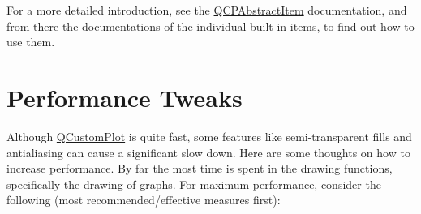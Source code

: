 For a more detailed introduction, see the \hyperlink{a00022}{Q\+C\+P\+Abstract\+Item} documentation, and from there the documentations of the individual built-\/in items, to find out how to use them.\hypertarget{index_performancetweaks}{}\section{Performance Tweaks}\label{index_performancetweaks}
Although \hyperlink{a00030_d8/d00/a00186}{Q\+Custom\+Plot} is quite fast, some features like semi-\/transparent fills and antialiasing can cause a significant slow down. Here are some thoughts on how to increase performance. By far the most time is spent in the drawing functions, specifically the drawing of graphs. For maximum performance, consider the following (most recommended/effective measures first)\+:

